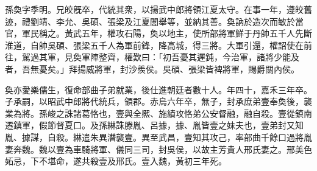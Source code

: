 \begin{pinyinscope}
 
 
 孫奐字季明。兄皎旣卒，代統其衆，以揚武中郎將領江夏太守。在事一年，遵皎舊迹，禮劉靖、李允、吳碩、張梁及江夏閭舉等，並納其善。奐訥於造次而敏於當官，軍民稱之。黃武五年，權攻石陽，奐以地主，使所部將軍鮮于丹帥五千人先斷淮道，自帥吳碩、張梁五千人為軍前鋒，降高城，得三將。大軍引還，權詔使在前往，駕過其軍，見奐軍陣整齊，權歎曰：「初吾憂其遲鈍，今治軍，諸將少能及者，吾無憂矣。」拜揚威將軍，封沙羨侯。吳碩、張梁皆裨將軍，賜爵關內侯。
 
 
 奐亦愛樂儒生，復命部曲子弟就業，後仕進朝廷者數十人。年四十，嘉禾三年卒。子承嗣，以昭武中郎將代統兵，領郡。赤烏六年卒，無子，封承庶弟壹奉奐後，襲業為將。孫峻之誅諸葛恪也，壹與全熈、施績攻恪弟公安督融，融自殺。壹從鎮南遷鎮軍，假節督夏口。及孫綝誅滕胤、呂據，據、胤皆壹之妹夫也，壹弟封又知胤、據謀，自殺。綝遣朱異潛襲壹。異至武昌，壹知其攻己，率部曲千餘口過將胤妻奔魏。魏以壹為車騎將軍、儀同三司，封吳侯，以故主芳貴人邢氏妻之。邢美色妬忌，下不堪命，遂共殺壹及邢氏。壹入魏，黃初三年死。
 
 
\end{pinyinscope}